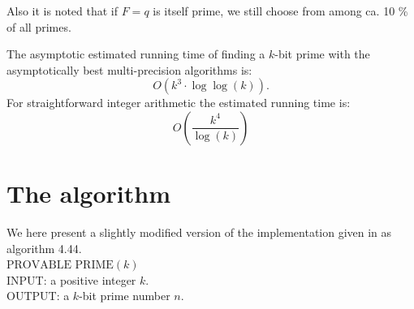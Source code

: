 \documentclass[11pt,a4paper]{article}
\begin{document}
Also it is noted that if $F=q$ is itself prime, we still
choose from among ca. 10 \% of all primes.

The asymptotic estimated running time of finding a $k$-bit prime with the
asymptotically best multi-precision algorithms is:
\[O(k^3\cdot\log\log(k)).\]
For straightforward integer arithmetic the estimated running time is:
\[O(\frac{k^{4}}{\log(k)})\]
\section{The algorithm}
We here present a slightly modified version of the implementation
given in \cite{Menezes:1997:HAC} as algorithm 4.44.\\

\noindent
$\text{PROVABLE PRIME}(k)$\\
INPUT: a positive integer $k$.\\
OUTPUT: a $k$-bit prime number $n$.
\end{document}

